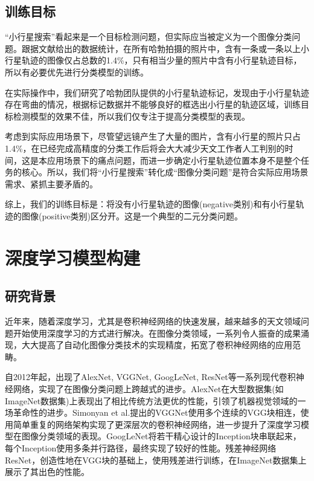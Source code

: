 \documentclass[12pt,a4paper]{article}%
\begin{document}
\subsection{训练目标}

“小行星搜索”看起来是一个目标检测问题，但实际应当被定义为一个图像分类问题。跟据文献给出的数据统计，在所有哈勃拍摄的照片中，含有一条或一条以上小行星轨迹的图像仅占总数的1.4\%，只有相当少量的照片中含有小行星轨迹目标，所以有必要优先进行分类模型的训练。

在实际操作中，我们研究了哈勃团队提供的小行星轨迹标记，发现由于小行星轨迹存在弯曲的情况，根据标记数据并不能够良好的框选出小行星的轨迹区域，训练目标检测模型的效果不佳，所以我们仅专注于提高分类模型的表现。

考虑到实际应用场景下，尽管望远镜产生了大量的图片，含有小行星的照片只占1.4\%，在已经完成高精度的分类工作后将会大大减少天文工作者人工判别的时间，这是本应用场景下的痛点问题，而进一步确定小行星轨迹位置本身不是整个任务的核心。所以，我们将“小行星搜索”转化成“图像分类问题”是符合实际应用场景需求、紧抓主要矛盾的。

综上，我们的训练目标是：将没有小行星轨迹的图像(negative类别)和有小行星轨迹的图像(positive类别)区分开。这是一个典型的二元分类问题。

\section{深度学习模型构建}

\subsection{研究背景}

近年来，随着深度学习，尤其是卷积神经网络的快速发展，越来越多的天文领域问题开始使用深度学习的方式进行解决。在图像分类领域，一系列令人振奋的成果涌现，大大提高了自动化图像分类技术的实现精度，拓宽了卷积神经网络的应用范畴。

自2012年起，出现了AlexNet, VGGNet, GoogLeNet, ResNet等一系列现代卷积神经网络，实现了在图像分类问题上跨越式的进步。AlexNet在大型数据集(如ImageNet数据集)上表现出了相比传统方法更优的性能，引领了机器视觉领域的一场革命性的进步。Simonyan et al.提出的VGGNet使用多个连续的VGG块相连，使用简单重复的网络架构实现了更深层次的卷积神经网络，进一步提升了深度学习模型在图像分类领域的表现。GoogLeNet将若干精心设计的Inception块串联起来，每个Inception使用多条并行路径，最终实现了较好的性能。残差神经网络ResNet，创造性地在VGG块的基础上，使用残差进行训练，在ImageNet数据集上展示了其出色的性能。
\end{document}
